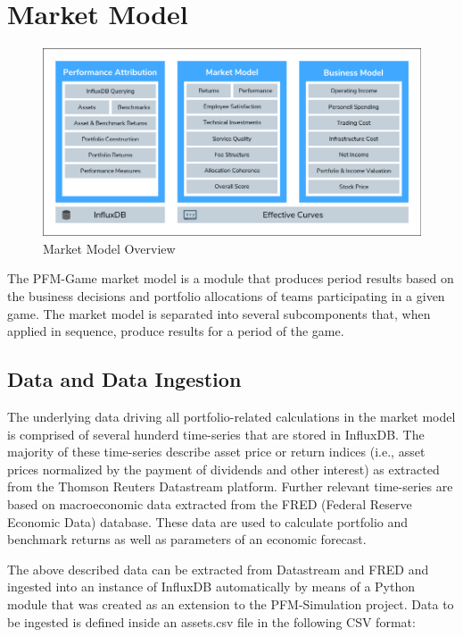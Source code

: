 \section{Market Model}

\begin{figure}[h!]
  \includegraphics[width=\textwidth]{img/market_model.png}
  \caption{Market Model Overview}
  \centering
\end{figure}

The PFM-Game market model is a module that produces period results based on the business decisions and portfolio allocations of teams participating in a given game. The market model is separated into several subcomponents that, when applied in sequence, produce results for a period of the game.

\subsection{Data and Data Ingestion}
The underlying data driving all portfolio-related calculations in the market model is comprised of several hunderd time-series that are stored in InfluxDB. The majority of these time-series describe asset price or return indices (i.e., asset prices normalized by the payment of dividends and other interest) as extracted from the Thomson Reuters Datastream platform. Further relevant time-series are based on macroeconomic data extracted from the FRED (Federal Reserve Economic Data) database. These data are used to calculate portfolio and benchmark returns as well as parameters of an economic forecast.

The above described data can be extracted from Datastream and FRED and ingested into an instance of InfluxDB automatically by means of a Python module that was created as an extension to the PFM-Simulation project. Data to be ingested is defined inside an assets.csv file in the following CSV format:

